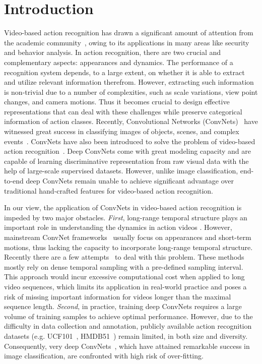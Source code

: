 \documentclass[runningheads]{llncs}
\begin{document}
\section{Introduction}\label{sec:intro}

Video-based action recognition has drawn a significant amount of attention from the academic community~\cite{SimonyanZ14,WangS13a,WangQT13a,Ng15,WangQT15a,gan2015devnet}, owing to its applications in many areas like security and behavior analysis.
In action recognition, there are two crucial and complementary aspects: appearances and dynamics.
The performance of a recognition system depends, to a large extent, on whether it is able to extract and utilize relevant information therefrom.
However, extracting such information is non-trivial due to a number of complexities, such as scale variations, view point changes, and camera motions.
Thus it becomes crucial to design effective representations that can deal with these challenges while preserve categorical information of action classes.
Recently, Convolutional Networks (ConvNets)~\cite{lecun-98} have witnessed great success in classifying images of objects, scenes, and complex events~\cite{KrizhevskySH12,SimonyanZ14a,SzegedyLJSRAEVR14,XiongY2015}.
ConvNets have also been introduced to solve the problem of video-based action recognition~\cite{KarpathyTSLSF14,SimonyanZ14,TranBFTP15,ZhangWWQW16}.
Deep ConvNets come with great modeling capacity and are capable of learning discriminative representation from raw visual data with the help of large-scale supervised datasets. However, unlike image classification, end-to-end deep ConvNets remain unable to achieve significant advantage over traditional hand-crafted features for video-based action recognition. 

In our view, the application of ConvNets in video-based action recognition is impeded by two major obstacles.
{\em First}, long-range temporal structure plays an important role in understanding the dynamics in action videos \cite{NieblesCF10,GaidonHS13,WangQT14a,FernandoGMGT15}.
However, mainstream ConvNet frameworks~\cite{SimonyanZ14,TranBFTP15} usually focus on appearances and short-term motions, thus lacking the capacity to incorporate long-range temporal structure.
Recently there are a few attempts~\cite{varol,Ng15,DonahueJ2015} to deal with this problem.
These methods mostly rely on dense temporal sampling with a pre-defined sampling interval. This approach would incur excessive computational cost when applied to long video sequences, which limits its application in real-world practice and poses a risk of missing important information for videos longer than the maximal sequence length.
{\em Second}, in practice, training deep ConvNets requires a large volume of training samples to achieve optimal performance. 
However, due to the difficulty in data collection and annotation, publicly available action recognition datasets (e.g. UCF101~\cite{Soomro12}, HMDB51~\cite{KuehneJGPS11}) remain limited, in both size and diversity.
Consequently, very deep ConvNets~\cite{SimonyanZ14a,IoffeS15}, which have attained remarkable success in image classification, are confronted with high risk of over-fitting.
\end{document}
